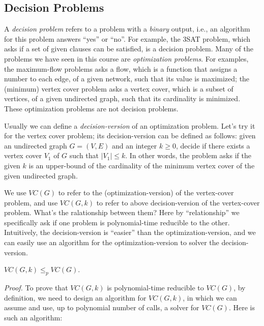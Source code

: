 \subsection*{Decision Problems}

A \emph{decision problem} refers to a problem with a \emph{binary} output, i.e., an algorithm
for this problem answers ``yes'' or ``no''.
For example, the 3SAT problem, which asks if a set of given clauses can be satisfied, is a decision problem.
Many of the problems we have seen in this course are \emph{optimization problems}. For examples, the maximum-flow problems
asks a flow, which is a function that assigns a number to each edge, of a given network, such that its value is maximized;
the (minimum) vertex cover problem asks a vertex cover, which is a subset of vertices, of a given undirected graph, 
such that its cardinality is minimized. These optimization problems are not decision problems.

Usually we can define a \emph{decision-version} of an optimization problem. Let's try it for the vertex cover problem;
its decision-version can be defined as follows: given an undirected graph $G = (V, E)$ and an integer $k\ge 0$,
decide if there exists a vertex cover $V_1$ of $G$ such that $|V_1| \le k$. In other words, the problem asks if the
given $k$ is an upper-bound of the cardinality of the minimum vertex cover of the given undirected graph.

We use $VC(G)$ to refer to the (optimization-version) of the vertex-cover problem, and use $VC(G, k)$ to refer to
above decision-version of the vertex-cover problem. What's the ralationship between them? Here by ``relationship''
we specifically ask if one problem is polynomial-time reducible to the other. Intuitively, the decision-version
is ``easier'' than the optimization-version, and we can easily use an algorithm for the optimization-version
to solver the decision-version.
\begin{fact}
$VC(G, k)\le_p VC(G)$.
\end{fact}
\emph{Proof.} To prove that $VC(G,k)$ is polynomial-time reducible to $VC(G)$, by definition, 
we need to design an algorithm for $VC(G, k)$, in which we can assume and use, up to polynomial number of calls,
a solver for $VC(G)$. Here is such an algorithm:

\begin{minipage}{0.8\textwidth}
	\xxx
	\xxx
	\xxx
	\xxx
	\xxx
\end{minipage}

